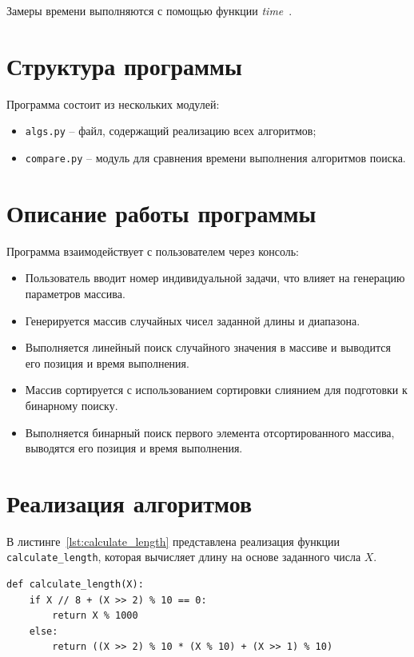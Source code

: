 \documentclass[a4paper, 12pt]{extreport}
\begin{document}
Замеры времени выполняются с помощью функции \textit{time}~\cite{bib4}.

\section{Структура программы}
Программа состоит из нескольких модулей: 
\begin{itemize}
    \item[--] \texttt{algs.py} -- файл, содержащий реализацию всех алгоритмов; 
    \item[--] \texttt{compare.py} -- модуль для сравнения времени выполнения алгоритмов поиска.
\end{itemize}

\section{Описание работы программы}
Программа взаимодействует с пользователем через консоль:
\begin{itemize}
    \item[--] Пользователь вводит номер индивидуальной задачи, что влияет на генерацию параметров массива.
    \item[--] Генерируется массив случайных чисел заданной длины и диапазона.
    \item[--] Выполняется линейный поиск случайного значения в массиве и выводится его позиция и время выполнения.
    \item[--] Массив сортируется с использованием сортировки слиянием для подготовки к бинарному поиску.
    \item[--] Выполняется бинарный поиск первого элемента отсортированного массива, выводятся его позиция и время выполнения.
\end{itemize}


\section{Реализация алгоритмов}
В листинге~\ref{lst:calculate_length} представлена реализация функции \texttt{calculate\_length}, которая вычисляет длину на основе заданного числа \( X \).

\begin{center}
\captionsetup{justification=raggedright,singlelinecheck=off}
\begin{lstlisting}
def calculate_length(X):
    if X // 8 + (X >> 2) % 10 == 0:
        return X % 1000
    else:
        return ((X >> 2) % 10 * (X % 10) + (X >> 1) % 10)
\end{lstlisting}
\captionsetup{justification=centering, singlelinecheck=off}
\label{lst:calculate_length}
\end{center}
\end{document}
